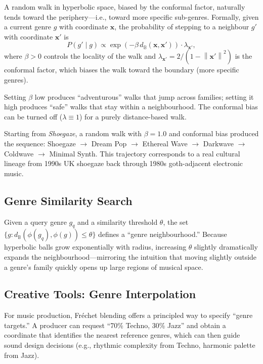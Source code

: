 \documentclass[12pt,a4paper]{article}
\newcommand{\ball}{\mathbb{B}}
\newcommand{\dist}{d_{\ball}}
\newcommand{\norm}[1]{\left\| #1 \right\|}
\newcommand{\Frechet}{Fr\'echet}
\begin{document}
A random walk in hyperbolic space, biased by the conformal factor, naturally tends toward the periphery---i.e., toward more specific sub-genres. Formally, given a current genre $g$ with coordinate $\mathbf{x}$, the probability of stepping to a neighbour $g'$ with coordinate $\mathbf{x}'$ is
\begin{equation}
  P(g' \mid g) \propto \exp\!\left(-\beta \, \dist(\mathbf{x}, \mathbf{x}')\right) \cdot \lambda_{\mathbf{x}'},
  \label{eq:random-walk}
\end{equation}
where $\beta > 0$ controls the locality of the walk and $\lambda_{\mathbf{x}'} = 2/(1 - \norm{\mathbf{x}'}^2)$ is the conformal factor, which biases the walk toward the boundary (more specific genres).

Setting $\beta$ low produces ``adventurous'' walks that jump across families; setting it high produces ``safe'' walks that stay within a neighbourhood. The conformal bias can be turned off ($\lambda \equiv 1$) for a purely distance-based walk.

\begin{example}
  \normalfont
  Starting from \emph{Shoegaze}, a random walk with $\beta = 1.0$ and conformal bias produced the sequence: Shoegaze $\to$ Dream Pop $\to$ Ethereal Wave $\to$ Darkwave $\to$ Coldwave $\to$ Minimal Synth. This trajectory corresponds to a real cultural lineage from 1990s UK shoegaze back through 1980s goth-adjacent electronic music.
\end{example}

\subsection{Genre Similarity Search}

Given a query genre $g_q$ and a similarity threshold $\theta$, the set $\{ g : \dist(\phi(g_q), \phi(g)) \le \theta \}$ defines a ``genre neighbourhood.'' Because hyperbolic balls grow exponentially with radius, increasing $\theta$ slightly dramatically expands the neighbourhood---mirroring the intuition that moving slightly outside a genre's family quickly opens up large regions of musical space.

\subsection{Creative Tools: Genre Interpolation}

For music production, \Frechet{} blending offers a principled way to specify ``genre targets.'' A producer can request ``70\% Techno, 30\% Jazz'' and obtain a coordinate that identifies the nearest reference genres, which can then guide sound design decisions (e.g., rhythmic complexity from Techno, harmonic palette from Jazz).
\end{document}

